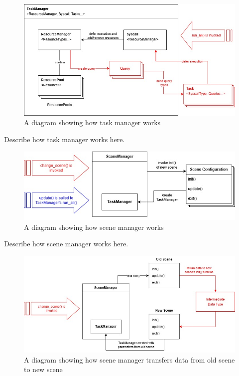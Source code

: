 \vspace{0.5cm}

\begin{figure}[h]
    \centering
    \includegraphics[width=\columnwidth, keepaspectratio]{images/taskmanager}
    \caption{A diagram showing how task manager works}
    \label{fig:taskmanager}
\end{figure}

\vspace{0.5cm}

Describe how task manager works here.

\vspace{0.5cm}

\begin{figure}[h]
    \centering
    \includegraphics[width=\columnwidth, keepaspectratio]{images/scenemanager}
    \caption{A diagram showing how scene manager works}
    \label{fig:scenemanager}
\end{figure}

\vspace{0.5cm}

Describe how scene manager works here.

\vspace{0.5cm}

\begin{figure}[h]
    \centering
    \includegraphics[width=\columnwidth, keepaspectratio]{images/scenemanager2}
    \caption{A diagram showing how scene manager transfers data from old scene to new scene}
    \label{fig:scenemanager2}
\end{figure}

